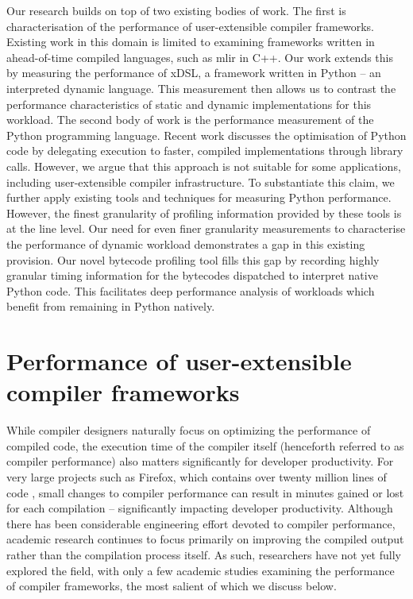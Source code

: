 Our research builds on top of two existing bodies of work.
The first is characterisation of the performance of user-extensible compiler frameworks. Existing work in this domain is limited to examining frameworks written in ahead-of-time compiled languages, such as \ac{mlir} in C++.
Our work extends this by measuring the performance of xDSL, a framework written in Python -- an interpreted dynamic language. This measurement then allows us to contrast the performance characteristics of static and dynamic implementations for this workload.
The second body of work is the performance measurement of the Python programming language.
Recent work discusses the optimisation of Python code by delegating execution to faster, compiled implementations through library calls. However, we argue that this approach is not suitable for some applications, including user-extensible compiler infrastructure.
To substantiate this claim, we further apply existing tools and techniques for measuring Python performance.
However, the finest granularity of profiling information provided by these tools is at the line level. Our need for even finer granularity measurements to characterise the performance of dynamic workload demonstrates a gap in this existing provision. Our novel bytecode profiling tool fills this gap by recording highly granular timing information for the bytecodes dispatched to interpret native Python code. This facilitates deep performance analysis of workloads which benefit from remaining in Python natively.


\section{Performance of user-extensible compiler frameworks}
\label{sec:perf-user-extensible-frameworks}

While compiler designers naturally focus on optimizing the performance of compiled code, the execution time of the compiler itself (henceforth referred to as compiler performance) also matters significantly for developer productivity.
For very large projects such as Firefox, which contains over twenty million lines of code \cite{bastienabadieEngineeringCodeQuality}, small changes to compiler performance can result in minutes gained or lost for each compilation -- significantly impacting developer productivity. Although there has been considerable engineering effort devoted to compiler performance, academic research continues to focus primarily on improving the compiled output rather than the compilation process itself.
As such, researchers have not yet fully explored the field, with only a few academic studies examining the performance of compiler frameworks, the most salient of which we discuss below.

